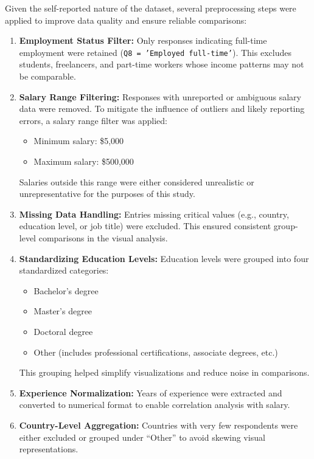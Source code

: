Given the self-reported nature of the dataset, several preprocessing steps were applied to improve data quality and ensure reliable comparisons:

\begin{enumerate}
    \item \textbf{Employment Status Filter:} Only responses indicating full-time employment were retained (\texttt{Q8 = 'Employed full-time'}). This excludes students, freelancers, and part-time workers whose income patterns may not be comparable.
    
    \item \textbf{Salary Range Filtering:} Responses with unreported or ambiguous salary data were removed. To mitigate the influence of outliers and likely reporting errors, a salary range filter was applied:
    \begin{itemize}
        \item Minimum salary: \$5,000
        \item Maximum salary: \$500,000
    \end{itemize}
    Salaries outside this range were either considered unrealistic or unrepresentative for the purposes of this study.

    \item \textbf{Missing Data Handling:} Entries missing critical values (e.g., country, education level, or job title) were excluded. This ensured consistent group-level comparisons in the visual analysis.

    \item \textbf{Standardizing Education Levels:} Education levels were grouped into four standardized categories:
    \begin{itemize}
        \item Bachelor’s degree
        \item Master’s degree
        \item Doctoral degree
        \item Other (includes professional certifications, associate degrees, etc.)
    \end{itemize}
    This grouping helped simplify visualizations and reduce noise in comparisons.

    \item \textbf{Experience Normalization:} Years of experience were extracted and converted to numerical format to enable correlation analysis with salary.

    \item \textbf{Country-Level Aggregation:} Countries with very few respondents were either excluded or grouped under “Other” to avoid skewing visual representations.
\end{enumerate}

